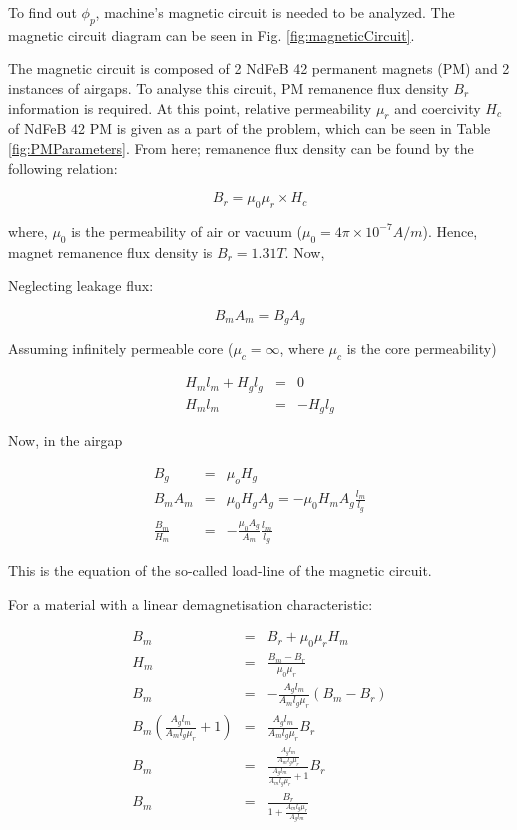 \documentclass[a4paper, 11pt, titlepage]{article}
\begin{document}
To find out $\phi_p$, machine's magnetic circuit is needed to be analyzed. The magnetic circuit diagram can be seen in Fig. \ref{fig:magneticCircuit}. 

The magnetic circuit is composed of 2 NdFeB 42 permanent magnets (PM) and 2 instances of airgaps. To analyse this circuit, PM remanence flux density $B_r$ information is required. At this point, relative permeability $\mu_r$ and coercivity $H_c$ of NdFeB 42 PM is given as a part of the problem, which can be seen in Table \ref{fig:PMParameters}. From here; remanence flux density can be found by the following relation:

\begin{equation}
	B_r = \mu_0\mu_r\times H_c 
	\label{label:remanenceFluxDensity}
\end{equation}

where, $\mu_0$ is the permeability of air or vacuum ($\mu_0=4\pi \times 10^{-7}A/m$). Hence, magnet remanence flux density  is $B_r=1.31 T$. Now,

Neglecting leakage flux:

\begin{equation}
	B_mA_m = B_gA_g
\end{equation}

Assuming infinitely permeable core ($\mu_c=\infty$, where $\mu_c$ is the core permeability)

\begin{eqnarray}
	H_ml_m + H_gl_g &=& 0 \\
	H_ml_m &=& -H_gl_g
\end{eqnarray}

Now, in the airgap

\begin{eqnarray}
	B_g &=& \mu_oH_g \\
	B_mA_m &=& \mu_0H_gA_g=-\mu_0H_mA_g\frac{l_m}{l_g} \\
	\frac{B_m}{H_m} &=& -\frac{\mu_0A_g}{A_m}\frac{l_m}{l_g}
	\label{label:loadLine}
\end{eqnarray}

This is the equation of the so-called load-line of the magnetic circuit. 

For a material with a linear demagnetisation characteristic:

\begin{eqnarray}
	B_m &=& B_r + \mu_0\mu_rH_m \\
	H_m &=& \frac{B_m-B_r}{\mu_0\mu_r} \\
	B_m &=& -\frac{A_gl_m}{A_ml_g\mu_r}(B_m-B_r) \\
	B_m(\frac{A_gl_m}{A_ml_g\mu_r}+1) &=& \frac{A_gl_m}{A_ml_g\mu_r}B_r \\
	B_m &=& \frac{\frac{A_gl_m}{A_ml_g\mu_r}}{\frac{A_gl_m}{A_ml_g\mu_r}+1}B_r \\
	B_m &=& \frac{B_r}{1+\frac{A_ml_g\mu_r}{A_gl_m}}
	\label{label:demagnetizationCharacteristics}
\end{eqnarray}
\end{document}

